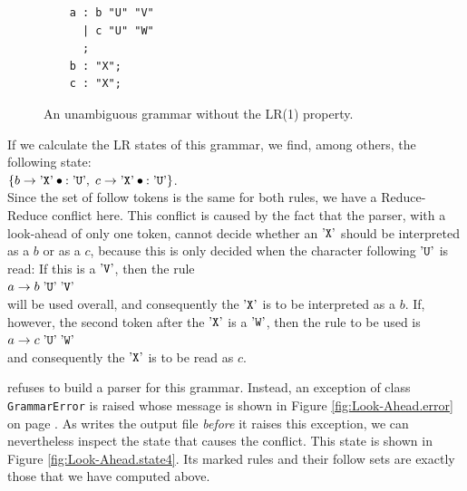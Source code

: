 \begin{figure}[!ht]
\centering
\begin{verbatim}
    a : b "U" "V"
      | c "U" "W"
      ;
    b : "X";
    c : "X";
\end{verbatim}
\vspace*{-0.3cm}
\caption{An unambiguous grammar without the LR(1) property.}
\label{fig:lr-conflict.g}
\end{figure}

If we calculate the LR states of this grammar,
we find, among others, the following state:
\\[0.2cm]
\hspace*{1.3cm}
$\{ b \rightarrow \saquoted{X} \mdot: \saquoted{U},\; c \rightarrow \saquoted{X} \mdot: \saquoted{U} \}$.
\\[0.2cm]
Since the set of follow tokens is the same for both rules, we have a Reduce-Reduce conflict here.
This conflict is caused by the fact that the parser, with a look-ahead of only one token, cannot
decide whether an $\mbox{'\texttt{X}'}$ should be interpreted as a $b$ or as a $c$, because this
is only decided when the character following $\mbox{'\texttt{U}'}$ is read: If this is
a $\mbox{'\texttt{V}'}$, then the rule
\\[0.2cm]
\hspace*{1.3cm}
$a \rightarrow b\; \mbox{'\texttt{U}'}\; \mbox{'\texttt{V}'}$
\\[0.2cm]
will be used overall, and consequently the $\mbox{'\texttt{X}'}$ is to be interpreted as a $b$. If, however, the second token
after the $\mbox{'\texttt{X}'}$ is a $\mbox{'\texttt{W}'}$, then the rule to be used is
\\[0.2cm]
\hspace*{1.3cm}
$a \rightarrow c \;\mbox{'\texttt{U}'}\; \mbox{'\texttt{W}'}$
\\[0.2cm]
and consequently the $\mbox{'\texttt{X}'}$ is to be read as $c$.

 refuses to build a parser for this grammar.  Instead, an exception of class
\texttt{GrammarError} is raised whose message is shown in Figure \ref{fig:Look-Ahead.error} on page
\pageref{fig:Look-Ahead.error}.  As  writes the output file \emph{before} it raises this
exception, we can nevertheless inspect the state that causes the conflict.  This state is shown in Figure
\ref{fig:Look-Ahead.state4}.  Its marked rules and their follow sets are exactly those that we have computed
above.

